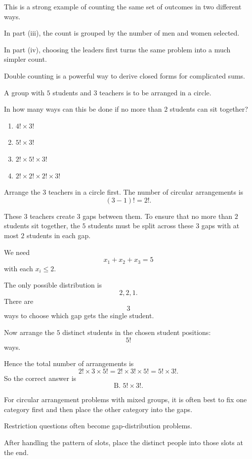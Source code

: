 \begin{takeaways}
\item This is a strong example of counting the same set of outcomes in two different ways.
\item In part (iii), the count is grouped by the number of men and women selected.
\item In part (iv), choosing the leaders first turns the same problem into a much simpler count.
\item Double counting is a powerful way to derive closed forms for complicated sums.
\end{takeaways}

\begin{problem}
A group with $5$ students and $3$ teachers is to be arranged in a circle.

In how many ways can this be done if no more than $2$ students can sit together?
\begin{enumerate}[label=\Alph*.]
\item $4!\times 3!$
\item $5!\times 3!$
\item $2!\times 5!\times 3!$
\item $2!\times 2!\times 2!\times 3!$
\end{enumerate}
\end{problem}

\begin{solution}
Arrange the $3$ teachers in a circle first. The number of circular arrangements is
\[
(3-1)! = 2!.
\]

These $3$ teachers create $3$ gaps between them. To ensure that no more than $2$ students sit together, the $5$ students must be split across these $3$ gaps with at most $2$ students in each gap.

We need
\[
x_1+x_2+x_3=5
\]
with each $x_i\le 2$.

The only possible distribution is
\[
2,2,1.
\]
There are
\[
3
\]
ways to choose which gap gets the single student.

Now arrange the $5$ distinct students in the chosen student positions:
\[
5!
\]
ways.

Hence the total number of arrangements is
\[
2!\times 3\times 5! = 2!\times 3!\times 5! = 5!\times 3!.
\]
So the correct answer is
\[
\boxed{\text{B. }5!\times 3!}.
\]
\end{solution}

\begin{takeaways}
\item For circular arrangement problems with mixed groups, it is often best to fix one category first and then place the other category into the gaps.
\item Restriction questions often become gap-distribution problems.
\item After handling the pattern of slots, place the distinct people into those slots at the end.
\end{takeaways}

